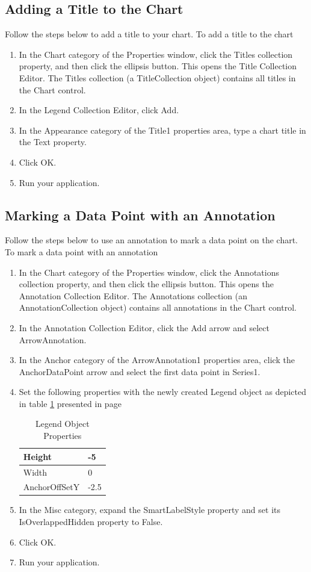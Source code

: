 \documentclass[12pt,a4paper,final,twoside,titlepage]{book}
\begin{document}
\subsection{Adding a Title to the Chart}
Follow the steps below to add a title to your chart.
To add a title to the chart
\begin{enumerate}
\item In the Chart category of the Properties window, click the Titles collection property, and then click the ellipsis button. This opens the Title Collection Editor.
The Titles collection (a TitleCollection object) contains all titles in the Chart control.
\item In the Legend Collection Editor, click Add.
\item In the Appearance category of the Title1 properties area, type a chart title in the Text property.
\item Click OK.
\item Run your application.
\end{enumerate}
\subsection{Marking a Data Point with an Annotation}
Follow the steps below to use an annotation to mark a data point on the chart.
To mark a data point with an annotation
\begin{enumerate}
\item In the Chart category of the Properties window, click the Annotations collection property, and then click the ellipsis button. This opens the Annotation Collection Editor.
The Annotations collection (an AnnotationCollection object) contains all annotations in the Chart control.
\item In the Annotation Collection Editor, click the Add arrow and select ArrowAnnotation.
\item In the Anchor category of the ArrowAnnotation1 properties area, click the AnchorDataPoint arrow and select the first data point in Series1.
\item Set the following properties with the newly created Legend object as depicted in table \ref{LegendObjectProperties} presented in page \pageref{LegendObjectProperties}
\begin{table}
\begin{center}
\caption{Legend Object Properties}
\label{LegendObjectProperties}
\begin{tabular}{|l|l|}
\hline
Height & -5 \\ \hline
Width & 0 \\ \hline
AnchorOffSetY & -2.5 \\ \hline
\end{tabular}
\end{center}
\end{table}
\item In the Misc category, expand the SmartLabelStyle property and set its IsOverlappedHidden property to False.
\item Click OK.
\item Run your application.
\end{enumerate}
\end{document}
